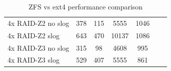 \begin{frame}
\begin{table}[h]
\begin{tabular}{lcccccc}
                    4x RAID-Z2 no slog & 378 & 115 & 5555 & 1046 \\
                    4x RAID-Z2 slog & 643 & 470 & 10137 & 1086 \\
                    4x RAID-Z3 no slog & 315 & 98 & 4608 & 995 \\
                    4x RAID-Z3 slog & 529 & 407 & 5555 & 861 \\
                    \bottomrule
                \end{tabular}
                \caption{ZFS vs ext4 performance comparison}
                \label{tab:zfs_ext4_comparison}
            \end{table}
    \end{frame}

